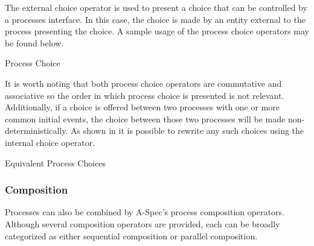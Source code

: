 \documentclass[letterpaper,10pt,draft]{book}
\begin{document}
The external choice operator is used to present a choice that can be controlled
by a processes interface.  In this case, the choice is made by an entity external
to the process presenting the choice.  A sample usage of the process choice operators
may be found  below.

\begin{example}
\begin{minipage}[t]{0.49\linewidth}
   
\end{minipage}
\begin{minipage}[t]{0.49\linewidth}
   \azbox
   
\end{minipage}

   \caption{Process Choice}
   \label{ex:ProcChoice}
\end{example}

It is worth noting that both process choice operators are commutative and associative
so the order in which process choice is presented is not relevant.  Additionally,
if a choice is offered between two processes with one or more common initial events,
the choice between those two processes will be made non-deterministically.  As shown
in  it is possible to rewrite any such choices using the internal
choice operator.

\begin{example}
\begin{minipage}[t]{0.49\linewidth}
   
\end{minipage}
\begin{minipage}[t]{0.49\linewidth}
   \azbox
   
\end{minipage}

   \caption{Equivalent Process Choices}
   \label{ex:ProcChoice2}
\end{example}

\subsubsection{Composition}
   \label{sect:ProcComp}

Processes can also be combined by A-Spec's process composition operators.  Although
several composition operators are provided, each can be broadly categorized as either
sequential composition or parallel composition.
\end{document}
